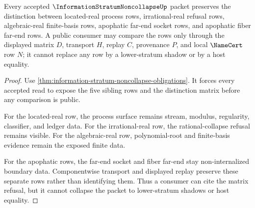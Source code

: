 \begin{theorem}
\label{thm:information-stratum-noncollapse-distinction-exactness}
Every accepted $\InformationStratumNoncollapseUp$ packet preserves the distinction between located-real process rows, irrational-real refusal rows, algebraic-real finite-basis rows, apophatic far-end socket rows, and apophatic fiber far-end rows. A public consumer may compare the rows only through the displayed matrix $D$, transport $H$, replay $C$, provenance $P$, and local $\NameCert$ row $N$; it cannot replace any row by a lower-stratum shadow or by a host equality.
\end{theorem}
\begin{proof}
Use \autoref{thm:information-stratum-noncollapse-obligations}. It forces every accepted read to expose the five sibling rows and the distinction matrix before any comparison is public.

For the located-real row, the process surface remains stream, modulus, regularity, classifier, and ledger data. For the irrational-real row, the rational-collapse refusal remains visible. For the algebraic-real row, polynomial-root and finite-basis evidence remain the exposed finite data.

For the apophatic rows, the far-end socket and fiber far-end stay non-internalized boundary data. Componentwise transport and displayed replay preserve these separate rows rather than identifying them. Thus a consumer can cite the matrix refusal, but it cannot collapse the packet to lower-stratum shadows or host equality.
\end{proof}



